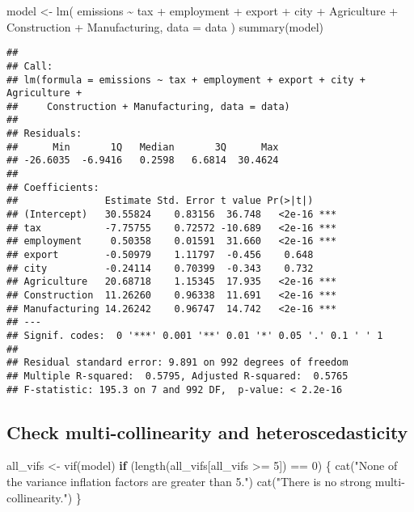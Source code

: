 \documentclass[
]{article}
\newenvironment{Shaded}{\begin{snugshade}}{\end{snugshade}}
\newcommand{\AttributeTok}[1]{\textcolor[rgb]{0.77,0.63,0.00}{#1}}
\newcommand{\ControlFlowTok}[1]{\textcolor[rgb]{0.13,0.29,0.53}{\textbf{#1}}}
\newcommand{\DecValTok}[1]{\textcolor[rgb]{0.00,0.00,0.81}{#1}}
\newcommand{\FunctionTok}[1]{\textcolor[rgb]{0.00,0.00,0.00}{#1}}
\newcommand{\NormalTok}[1]{#1}
\newcommand{\OtherTok}[1]{\textcolor[rgb]{0.56,0.35,0.01}{#1}}
\newcommand{\SpecialCharTok}[1]{\textcolor[rgb]{0.00,0.00,0.00}{#1}}
\newcommand{\StringTok}[1]{\textcolor[rgb]{0.31,0.60,0.02}{#1}}
\begin{document}
\begin{Shaded}
\begin{Highlighting}[]
\NormalTok{model }\OtherTok{\textless{}{-}}
  \FunctionTok{lm}\NormalTok{(}
\NormalTok{    emissions }\SpecialCharTok{\textasciitilde{}}\NormalTok{ tax }\SpecialCharTok{+}\NormalTok{ employment }\SpecialCharTok{+}\NormalTok{ export }\SpecialCharTok{+}\NormalTok{ city }\SpecialCharTok{+}\NormalTok{ Agriculture }\SpecialCharTok{+}\NormalTok{ Construction }\SpecialCharTok{+}\NormalTok{ Manufacturing,}
    \AttributeTok{data =}\NormalTok{ data}
\NormalTok{  )}
\FunctionTok{summary}\NormalTok{(model)}
\end{Highlighting}
\end{Shaded}

\begin{verbatim}
## 
## Call:
## lm(formula = emissions ~ tax + employment + export + city + Agriculture + 
##     Construction + Manufacturing, data = data)
## 
## Residuals:
##      Min       1Q   Median       3Q      Max 
## -26.6035  -6.9416   0.2598   6.6814  30.4624 
## 
## Coefficients:
##               Estimate Std. Error t value Pr(>|t|)    
## (Intercept)   30.55824    0.83156  36.748   <2e-16 ***
## tax           -7.75755    0.72572 -10.689   <2e-16 ***
## employment     0.50358    0.01591  31.660   <2e-16 ***
## export        -0.50979    1.11797  -0.456    0.648    
## city          -0.24114    0.70399  -0.343    0.732    
## Agriculture   20.68718    1.15345  17.935   <2e-16 ***
## Construction  11.26260    0.96338  11.691   <2e-16 ***
## Manufacturing 14.26242    0.96747  14.742   <2e-16 ***
## ---
## Signif. codes:  0 '***' 0.001 '**' 0.01 '*' 0.05 '.' 0.1 ' ' 1
## 
## Residual standard error: 9.891 on 992 degrees of freedom
## Multiple R-squared:  0.5795, Adjusted R-squared:  0.5765 
## F-statistic: 195.3 on 7 and 992 DF,  p-value: < 2.2e-16
\end{verbatim}

\hypertarget{check-multi-collinearity-and-heteroscedasticity}{%
\subsection{Check multi-collinearity and
heteroscedasticity}\label{check-multi-collinearity-and-heteroscedasticity}}

\begin{Shaded}
\begin{Highlighting}[]
\NormalTok{all\_vifs }\OtherTok{\textless{}{-}} \FunctionTok{vif}\NormalTok{(model)}
\ControlFlowTok{if}\NormalTok{ (}\FunctionTok{length}\NormalTok{(all\_vifs[all\_vifs }\SpecialCharTok{\textgreater{}=} \DecValTok{5}\NormalTok{]) }\SpecialCharTok{==} \DecValTok{0}\NormalTok{) \{}
  \FunctionTok{cat}\NormalTok{(}\StringTok{"None of the variance inflation factors are greater than 5."}\NormalTok{)}
  \FunctionTok{cat}\NormalTok{(}\StringTok{"There is no strong multi{-}collinearity."}\NormalTok{)}
\NormalTok{\}}
\end{Highlighting}
\end{Shaded}
\end{document}
